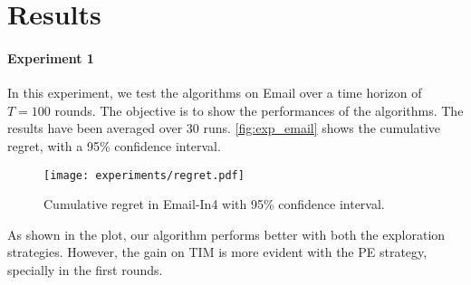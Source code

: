 \section{Results}

\paragraph{Experiment 1}
In this experiment, we test the algorithms on Email over a time horizon of $T=100$ rounds. The objective is to show the performances of the algorithms. The results have been averaged over 30 runs. \autoref{fig:exp_email} shows the cumulative regret, with a 95\% confidence interval.

\begin{figure}[H]
  \centering
  \texttt{[image: experiments/regret.pdf]}
\caption{Cumulative regret in Email-In4 with 95\% confidence interval.}
\label{fig:exp_email}
\end{figure}

As shown in the plot, our algorithm performs better with both the exploration strategies. However, the gain on TIM is more evident with the PE strategy, specially in the first rounds.